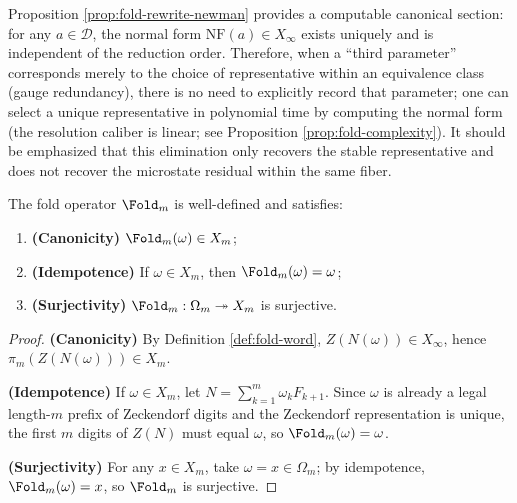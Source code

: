 \begin{remark}\label{rem:fold-normal-form-computable-section}
Proposition \ref{prop:fold-rewrite-newman} provides a computable canonical section: for any $a\in\mathcal{D}$, the normal form $\mathrm{NF}(a)\in X_\infty$ exists uniquely and is independent of the reduction order. Therefore, when a ``third parameter'' corresponds merely to the choice of representative within an equivalence class (gauge redundancy), there is no need to explicitly record that parameter; one can select a unique representative in polynomial time by computing the normal form (the resolution caliber is linear; see Proposition \ref{prop:fold-complexity}). It should be emphasized that this elimination only recovers the stable representative and does not recover the microstate residual within the same fiber.
\end{remark}

\begin{proposition}\label{prop:fold-basic}
The fold operator $\Fold_m$ is well-defined and satisfies:
\begin{enumerate}
\normalfont
  \item \textbf{(Canonicity)} $\Fold_m(\omega)\in X_m$;
  \item \textbf{(Idempotence)} If $\omega\in X_m$, then $\Fold_m(\omega)=\omega$;
  \item \textbf{(Surjectivity)} $\Fold_m:\Omega_m\twoheadrightarrow X_m$ is surjective.
\end{enumerate}
\end{proposition}

\begin{proof}
\textbf{(Canonicity)} By Definition \ref{def:fold-word}, $Z(N(\omega))\in X_\infty$, hence $\pi_m(Z(N(\omega)))\in X_m$.

\textbf{(Idempotence)} If $\omega\in X_m$, let $N=\sum_{k=1}^m \omega_k F_{k+1}$. Since $\omega$ is already a legal length-$m$ prefix of Zeckendorf digits and the Zeckendorf representation is unique, the first $m$ digits of $Z(N)$ must equal $\omega$, so $\Fold_m(\omega)=\omega$.

\textbf{(Surjectivity)} For any $x\in X_m$, take $\omega=x\in\Omega_m$; by idempotence, $\Fold_m(\omega)=x$, so $\Fold_m$ is surjective.
\end{proof}
